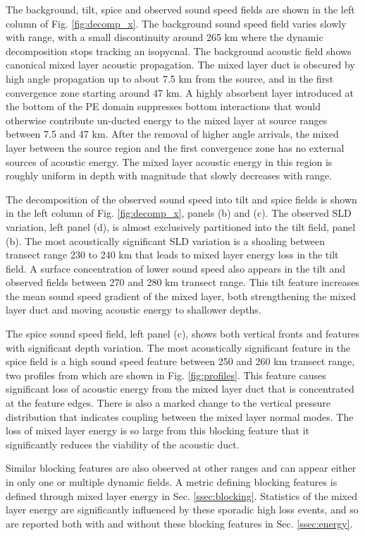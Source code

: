 \documentclass[preprint,NumberedRefs]{JASA}
\begin{document}
The background, tilt, spice and observed sound speed fields are shown in the left column of Fig. \ref{fig:decomp_x}. The background sound speed field varies slowly with range, with a small discontinuity around 265 km where the dynamic decomposition stops tracking an isopycnal. The background acoustic field shows canonical mixed layer acoustic propagation. The mixed layer duct is obscured by high angle propagation up to about 7.5 km from the source, and in the first convergence zone starting around 47 km. A highly absorbent layer introduced at the bottom of the PE domain suppresses bottom interactions that would otherwise contribute un-ducted energy to the mixed layer at source ranges between 7.5 and 47 km. After the removal of higher angle arrivals, the mixed layer between the source region and the first convergence zone has no external sources of acoustic energy. The mixed layer acoustic energy in this region is roughly uniform in depth with magnitude that slowly decreases with range.

The decomposition of the observed sound speed into tilt and spice fields is shown in the left column of Fig. \ref{fig:decomp_x}, panels (b) and (c). The observed SLD variation, left panel (d), is almost exclusively partitioned into the tilt field, panel (b). The most acoustically significant SLD variation is a shoaling between transect range 230 to 240 km that leads to mixed layer energy loss in the tilt field. A surface concentration of lower sound speed also appears in the tilt and observed fields between 270 and 280 km transect range. This tilt feature increases the mean sound speed gradient of the mixed layer, both strengthening the mixed layer duct and moving acoustic energy to shallower depths.

The spice sound speed field, left panel (c), shows both vertical fronts and features with significant depth variation. The most acoustically significant feature in the spice field is a high sound speed feature between 250 and 260 km transect range, two profiles from which are shown in Fig. \ref{fig:profiles}. This feature causes significant loss of acoustic energy from the mixed layer duct that is concentrated at the feature edges. There is also a marked change to the vertical pressure distribution that indicates coupling between the mixed layer normal modes. The loss of mixed layer energy is so large from this blocking feature that it significantly reduces the viability of the acoustic duct.

Similar blocking features are also observed at other ranges and can appear either in only one or multiple dynamic fields. A metric defining blocking features is defined through mixed layer energy in Sec. \ref{ssec:blocking}. Statistics of the mixed layer energy are significantly influenced by these sporadic high loss events, and so are reported both with and without these blocking features in Sec. \ref{ssec:energy}.
\end{document}
